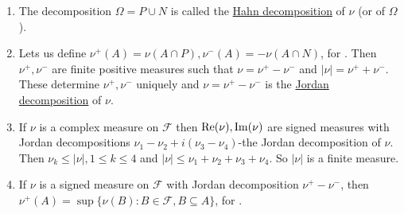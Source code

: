 \documentclass{article}
\begin{document}
\begin{remark} 
\begin{enumerate}
    \item The decomposition $\Omega = P\displaystyle\cup N$ is called the \noindent\underline{Hahn decomposition} of $\nu$ (or of $\Omega$).
    \item Lets us define $\nu^{+}(A) = \nu(A\cap P), \nu^{-}(A) = -\nu(A\cap N)$, for . Then $\nu^{+}, \nu^{-}$ are finite positive measures such that $\nu = \nu^{+}-\nu^{-}$ and $|\nu|=\nu^{+}+\nu^{-}$. These determine $\nu^{+}, \nu^{-}$ uniquely and $\nu = \nu^{+}-\nu^{-}$ is the \noindent\underline{Jordan decomposition} of $\nu$.
    \item If $\nu$ is a complex measure on $\mathcal{F}$ then $\operatorname{Re}(\nu), \operatorname{Im}(\nu)$ are signed measures with Jordan decompositions $\nu_1-\nu_2+i(\nu_3-\nu_4)$-the Jordan decomposition of $\nu$. Then $\nu_k \leq |\nu|, 1\leq k \leq 4$ and $|\nu|\leq \nu_1+\nu_2+\nu_3+\nu_4$. So $|\nu|$ is a finite measure. 
    \item If $\nu$ is a signed measure on $\mathcal{F}$ with Jordan decomposition $\nu^+-\nu^-$, then $\nu^+(A)=\sup\{\nu(B):B\in\mathcal{F}, B\subseteq A\}$, for .
\end{enumerate}
\end{remark}
\end{document}
